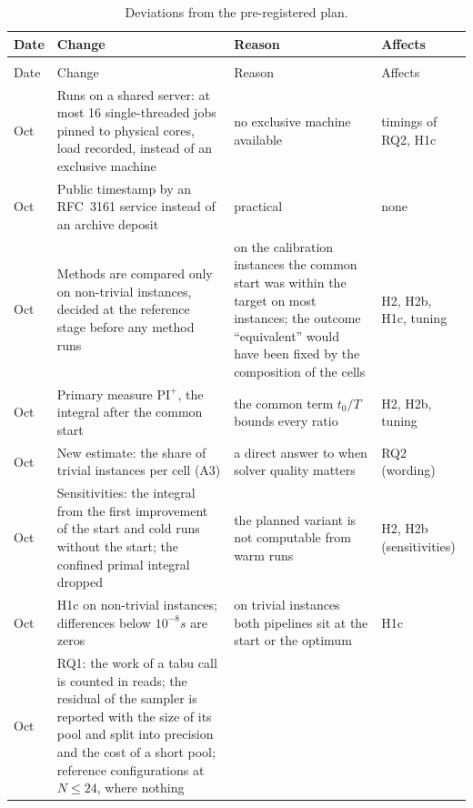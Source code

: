 {\footnotesize\setlength{\tabcolsep}{3pt}
\begin{longtable}{>{\raggedright\arraybackslash}p{}>{\raggedright\arraybackslash}p{}>{\raggedright\arraybackslash}p{}>{\raggedright\arraybackslash}p{}} %
\caption{Deviations from the pre-registered plan.}\label{tab:deviations}\\
\toprule
Date & Change & Reason & Affects \\
\midrule
\endfirsthead
\multicolumn{4}{l}{Table~\ref{tab:deviations} (continued)}\\
\toprule
Date & Change & Reason & Affects \\
\midrule
\endhead
\bottomrule
\endlastfoot
11 Oct & Runs on a shared server: at most 16 single-threaded jobs pinned to physical cores, load recorded, instead of
an exclusive machine & no exclusive machine available & timings of RQ2, H1c \\
11 Oct & Public timestamp by an RFC~3161 service instead of an archive deposit & practical & none \\
11 Oct & Methods are compared only on non-trivial instances, decided at the reference stage before any method runs
& on the calibration instances the common start was within the target on most instances; the outcome
``equivalent'' would have been fixed by the composition of the cells & H2, H2b, H1c, tuning \\
11 Oct & Primary measure $\mathrm{PI}^{+}$, the integral after the common start & the common term $t_0/T$ bounds every
ratio & H2, H2b, tuning \\
11 Oct & New estimate: the share of trivial instances per cell (A3) & a direct answer to when solver quality matters &
RQ2 (wording) \\
11 Oct & Sensitivities: the integral from the first improvement of the start and cold runs without the start; the
confined primal integral dropped & the planned variant is not computable from warm runs & H2, H2b (sensitivities) \\
11 Oct & H1c on non-trivial instances; differences below $10^{-8}s$ are zeros & on trivial instances both pipelines sit
at the start or the optimum & H1c \\
11 Oct & RQ1: the work of a tabu call is counted in reads; the residual of the sampler is reported with the size of
its pool and split into precision and the cost of a short pool; reference configurations at $N \le 24$, where nothing

\end{longtable}}
